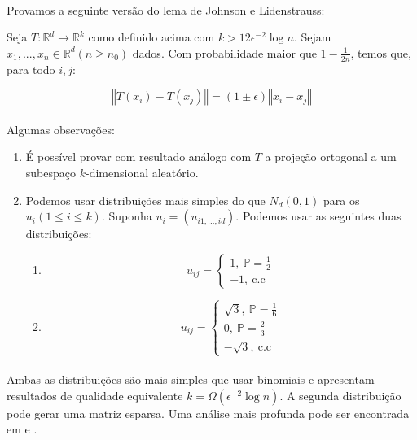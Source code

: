 \paragraph{}Provamos a seguinte versão do lema de Johnson e Lidenstrauss:
\begin{teorema}
Seja $T \colon \mathbb{R}^d \to \mathbb{R}^k$ como definido acima com $k > 12\epsilon^{-2}\log{n}$. Sejam $x_1,...,x_n \in \mathbb{R}^d (n \geq n_0)$ dados. Com probabilidade maior que $1 - \frac{1}{2n}$, temos que, para todo $i,j$:
\end{teorema}
\begin{equation*}
    \left\Vert T(x_i) - T(x_j) \right\Vert   = (1 \pm \epsilon)\left\Vert x_i - x_j \right\Vert
\end{equation*}
\paragraph{}Algumas observações:
\begin{enumerate}
    \item É possível provar com resultado análogo com $T$ a projeção ortogonal a um subespaço $k$-dimensional aleatório.
    \item Podemos usar distribuições mais simples do que $N_d(0,1)$ para os $u_i(1 \leq i \leq k)$. Suponha $u_i = (u_{i1,...,id})$. Podemos usar as seguintes duas distribuições:
    \begin{enumerate}
        \item 
        \[
                 u_{ij}=   \begin{cases} 
                        1,\ \mathbb{P}=\frac{1}{2}\\ 
                        -1,\ \text{c.c}\end{cases}
        \]
        \item
        \[
                 u_{ij}=   \begin{cases} 
                        \sqrt{3},\ \mathbb{P}=\frac{1}{6}\\ 
                        0,\ \mathbb{P}=\frac{2}{3} \\
                        -\sqrt{3},\ \text{c.c}\end{cases}
        \]
    \end{enumerate}
\end{enumerate}
\paragraph{} Ambas as distribuições são mais simples que usar binomiais e apresentam resultados de qualidade equivalente $k = \Omega(\epsilon^{-2}\log{n})$. A segunda distribuição pode gerar uma matriz esparsa. Uma análise mais profunda pode ser encontrada em \cite{achlioptas_2003}
e \cite{bingham_2001}.
